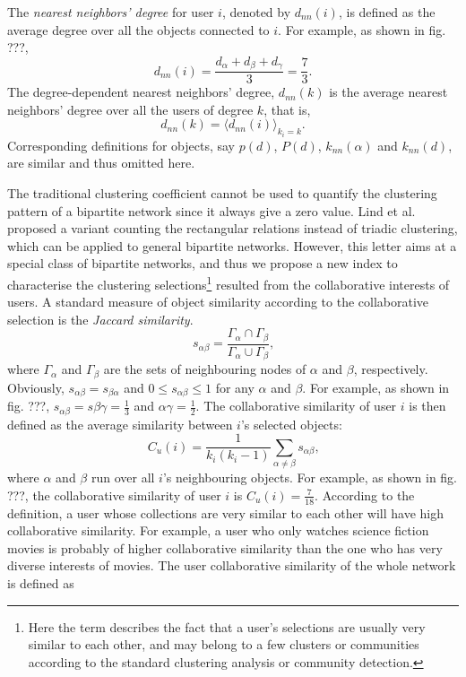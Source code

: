       The \emph{nearest neighbors’ degree} for user $i$, denoted by $d_{nn}(i)$, is defined as the average degree over all the objects connected to $i$. For example, as shown in fig. ???,
      $$d_{nn}(i) = \frac{d_\alpha + d_\beta + d_\gamma}{3} = \frac{7}{3}\mbox{.}$$
      The degree-dependent nearest neighbors’ degree, $d_{nn}(k)$ is the average nearest neighbors’ degree over all the users of degree $k$, that is,
      $$d_{nn}(k) = \langle d_{nn}(i) \rangle_{k_i=k}\mbox{.}$$
      Corresponding definitions for objects, say $p(d)$, $P(d)$, $k_{nn}(\alpha)$ and $k_{nn}(d)$, are similar and thus omitted here.
      
      The traditional clustering coefficient\cite{WattsStrogatz1998} cannot be used to quantify the clustering pattern of a bipartite network since it always give a zero value. Lind et al.\cite{LindGonzalezHerrmann2005} proposed a variant counting the rectangular relations instead of triadic clustering, which can be applied to general bipartite networks. However, this letter aims at a special class of bipartite networks, and thus we propose a new index to characterise the clustering selections\footnote{Here the term  describes the fact that a user's selections are usually very similar to each other, and may belong to a few clusters or communities according to the standard clustering analysis or community detection.} resulted from the collaborative interests of users. A standard measure of object similarity according to the collaborative selection is the \emph{Jaccard similarity}.\cite{Jaccard1901}
      $$s_{\alpha\beta} = \frac{\Gamma_\alpha \cap \Gamma_\beta}{\Gamma_\alpha \cup \Gamma_\beta}\mbox{,}$$
      where $\Gamma_\alpha$ and $\Gamma_\beta$ are the sets of neighbouring nodes of $\alpha$ and $\beta$, respectively. Obviously, $s_{\alpha\beta} = s_{\beta\alpha}$ and $0 \leq s_{\alpha\beta} \leq 1$ for any $\alpha$ and $\beta$. For example, as shown in fig. ???, $s_{\alpha\beta} = s{\beta\gamma} = \frac{1}{3}$ and ${\alpha\gamma} = \frac{1}{2}$. The collaborative similarity of user $i$ is then defined as the average similarity between $i$'s selected objects:
      $$C_u(i) = \frac{1}{k_i(k_i-1)} \sum_{\alpha\neq\beta} s_{\alpha\beta}\mbox{,}$$
      where $\alpha$ and $\beta$ run over all $i$'s neighbouring objects. For example, as shown in fig. ???, the collaborative similarity of user $i$ is $C_u(i) = \frac{7}{18}$. According to the definition, a user whose collections are very similar to each other will have high collaborative similarity. For example, a user who only watches science fiction movies is probably of higher collaborative similarity than the one who has very diverse interests of movies. The user collaborative similarity of the whole network is defined as
